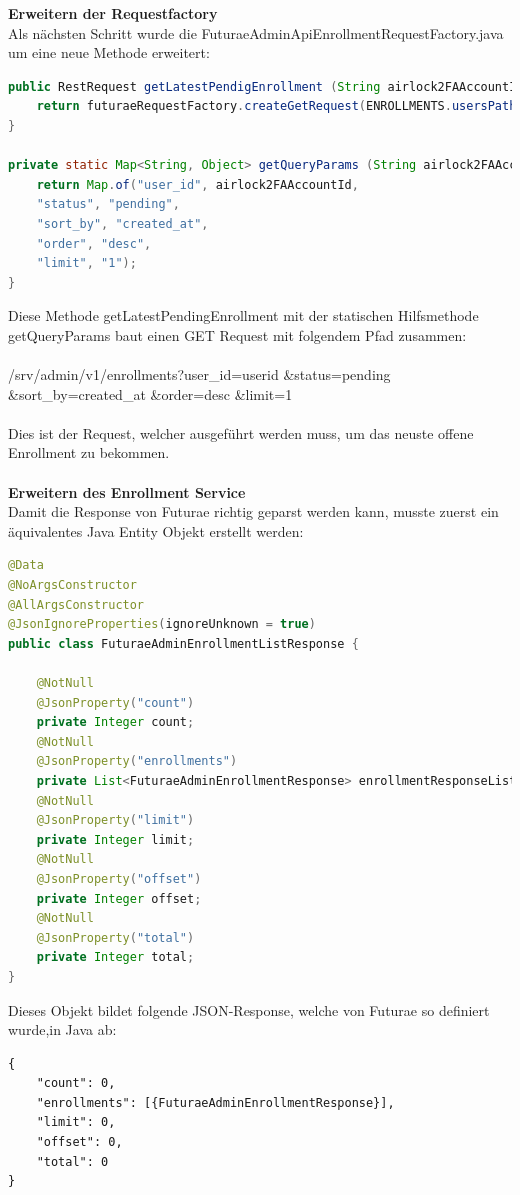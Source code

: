 \textbf{Erweitern der Requestfactory}\\
Als nächsten Schritt wurde die FuturaeAdminApiEnrollmentRequestFactory.java um eine neue Methode erweitert:
\begin{lstlisting}[language=Java]
public RestRequest getLatestPendigEnrollment (String airlock2FAAccountId) {
	return futuraeRequestFactory.createGetRequest(ENROLLMENTS.usersPath(), getQueryParams(airlock2FAAccountId));
}

private static Map<String, Object> getQueryParams (String airlock2FAAccountId) {
	return Map.of("user_id", airlock2FAAccountId,
	"status", "pending",
	"sort_by", "created_at",
	"order", "desc",
	"limit", "1");
}
\end{lstlisting}
Diese Methode \flqq getLatestPendingEnrollment\frqq{} mit der statischen Hilfsmethode \flqq getQueryParams \frqq{} baut einen GET Request mit folgendem Pfad zusammen:\\\\
/srv/admin/v1/enrollments?user\_id={userid}
\newline\&status=pending 
\newline\&sort\_by=created\_at 
\newline\&order=desc
\newline\&limit=1\\\\
Dies ist der Request, welcher ausgeführt werden muss, um das neuste offene Enrollment zu bekommen.\\\\
\textbf{Erweitern des Enrollment Service}\\
Damit die Response von Futurae richtig geparst werden kann, musste zuerst ein äquivalentes Java Entity Objekt erstellt werden:
\begin{lstlisting}[language=Java]
@Data
@NoArgsConstructor
@AllArgsConstructor
@JsonIgnoreProperties(ignoreUnknown = true)
public class FuturaeAdminEnrollmentListResponse {
	
	@NotNull
	@JsonProperty("count")
	private Integer count;
	@NotNull
	@JsonProperty("enrollments")
	private List<FuturaeAdminEnrollmentResponse> enrollmentResponseList;
	@NotNull
	@JsonProperty("limit")
	private Integer limit;
	@NotNull
	@JsonProperty("offset")
	private Integer offset;
	@NotNull
	@JsonProperty("total")
	private Integer total;
}
\end{lstlisting}
Dieses Objekt bildet folgende JSON-Response, welche von Futurae so definiert wurde,in Java ab:
\begin{verbatim}
{
	"count": 0,
	"enrollments": [{FuturaeAdminEnrollmentResponse}],
	"limit": 0,
	"offset": 0,
	"total": 0
}
\end{verbatim}
